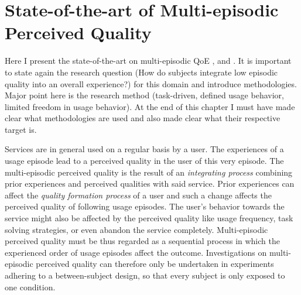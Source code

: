 \chapter{State-of-the-art of Multi-episodic Perceived Quality}\label{chap:state-of-the-art}
\begin{chapter-abstract}
Here I present the state-of-the-art on multi-episodic QoE \cite{duncanson_average_1969}, and \cite{moller_single-call_2011}.
It is important to state again the research question (How do subjects integrate low episodic quality into an overall experience?) for this domain and introduce methodologies.
Major point here is the research method (task-driven, defined usage behavior, limited freedom in usage behavior).
At the end of this chapter I must have made clear what methodologies are used and also made clear what their respective target is.
\end{chapter-abstract}


Services are in general used on a regular basis by a user.
The experiences of a usage episode lead to a perceived quality in the user of this very episode. %
The multi-episodic perceived quality is the result of an \emph{integrating process} combining prior experiences and perceived qualities with said service.
Prior experiences can affect the \emph{quality formation process} of a user and such a change affects the perceived quality of following usage episodes.
The user's behavior towards the service might also be affected by the perceived quality like usage frequency, task solving strategies, or even abandon the service completely.
Multi-episodic perceived quality must be thus regarded as a sequential process in which the experienced order of usage episodes affect the outcome. %
Investigations on multi-episodic perceived quality can therefore only be undertaken in experiments adhering to a between-subject design, so that every subject is only exposed to one condition.

